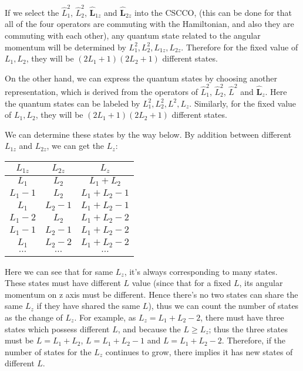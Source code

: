 If we select the $\hat{L}_{1}^{2}$, $\hat{L}_{2}^{2}$,
$\hat{\mathbf{L}}_{1z}$ and $\hat{\mathbf{L}}_{2z}$ into the CSCCO,
(this can be done for that all of the four operators are commuting
with the Hamiltonian, and also they are commuting with each other),
any quantum state related to the angular momentum will be determined
by $L^{2}_{1},L^{2}_{2},L_{1z},L_{2z}$. Therefore for the fixed
value of $L_{1}, L_{2}$, they will be $(2L_{1}+1)(2L_{2}+1)$
different states.

On the other hand, we can express the quantum states by choosing
another representation, which is derived from the operators of
$\hat{L}^{2}_{1}$, $\hat{L}^{2}_{2}$, $\hat{L}^{2}$ and
$\hat{\mathbf{L}}_{z}$. Here the quantum states can be labeled by
$L^{2}_{1},L^{2}_{2},L^{2},L_{z}$. Similarly, for the fixed value of
$L_{1}, L_{2}$, they will be $(2L_{1}+1)(2L_{2}+1)$ different
states.

We can determine these states by the way below. By addition between
different $L_{1z}$ and $L_{2z}$, we can get the $L_{z}$:
\begin{center}\label{ANGULARTABLE:1}
\begin{tabular}{c c c}
  \hline
  $L_{1z}$ & $L_{2z}$ & $L_{z}$ \\
  \hline
  $L_{1}$     & $L_{2 }$     & $L_{1}+L_{2}$ \\
  $L_{1}-1$   & $L_{2 }$     & $L_{1}+L_{2}-1$ \\
  $L_{1}$     & $L_{2 }-1$   & $L_{1}+L_{2}-1$ \\
  $L_{1}-2$   & $L_{2 }$     & $L_{1}+L_{2}-2$ \\
  $L_{1}-1$   & $L_{2 }-1$   & $L_{1}+L_{2}-2$ \\
  $L_{1}$     & $L_{2 }-2$   & $L_{1}+L_{2}-2$ \\
  $\cdots$    & $\cdots$     & $\cdots$ \\
  \hline
\end{tabular}
\end{center}

Here we can see that for same $L_{z}$, it's always corresponding to
many states. These states must have different $L$ value (since that
for a fixed $L$, its angular momentum on z axis must be different.
Hence there's no two states can share the same $L_{z}$ if they have
shared the same $L$), thus we can count the number of states as the
change of $L_{z}$. For example, as $L_{z} = L_{1}+L_{2}-2$, there
must have three states which possess different $L$, and because the
$L \geq L_{z}$; thus the three states must be $L = L_{1}+L_{2}$, $L
= L_{1}+L_{2}-1$ and $L = L_{1}+L_{2}-2$. Therefore, if the number
of states for the $L_{z}$ continues to grow, there implies it has
new states of different $L$.

